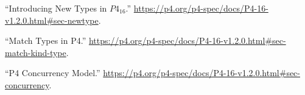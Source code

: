 \documentclass[11pt]{article}
\begin{document}
{{\begin{thebibliography}{37}
\mdbibitemlabel{{}[11]}\textquotedblleft{}Introducing New Types in $P4_{16}$.\textquotedblright{} \href{https://p4.org/p4-spec/docs/P4-16-v1.2.0.html\%23sec-newtype}{{\ttfamily https://\hspace{0pt}p4.\hspace{0pt}org/\hspace{0pt}p4-\hspace{0pt}spec/\hspace{0pt}docs/\hspace{0pt}P4-\hspace{0pt}16-\hspace{0pt}v1.\hspace{0pt}2.\hspace{0pt}0.\hspace{0pt}html\#\hspace{0pt}sec-\hspace{0pt}newtype}}.\label{p4newtypes}%

\mdbibitemlabel{{}[12]}\textquotedblleft{}Match Types in P4.\textquotedblright{} \href{https://p4.org/p4-spec/docs/P4-16-v1.2.0.html\%23sec-match-kind-type}{{\ttfamily https://\hspace{0pt}p4.\hspace{0pt}org/\hspace{0pt}p4-\hspace{0pt}spec/\hspace{0pt}docs/\hspace{0pt}P4-\hspace{0pt}16-\hspace{0pt}v1.\hspace{0pt}2.\hspace{0pt}0.\hspace{0pt}html\#\hspace{0pt}sec-\hspace{0pt}match-\hspace{0pt}kind-\hspace{0pt}type}}.\label{p4matchtypes}%

\mdbibitemlabel{{}[13]}\textquotedblleft{}P4 Concurrency Model.\textquotedblright{} \href{https://p4.org/p4-spec/docs/P4-16-v1.2.0.html\%23sec-concurrency}{{\ttfamily https://\hspace{0pt}p4.\hspace{0pt}org/\hspace{0pt}p4-\hspace{0pt}spec/\hspace{0pt}docs/\hspace{0pt}P4-\hspace{0pt}16-\hspace{0pt}v1.\hspace{0pt}2.\hspace{0pt}0.\hspace{0pt}html\#\hspace{0pt}sec-\hspace{0pt}concurrency}}.\label{p4concurrency}%


\end{thebibliography}}}
\end{document}

